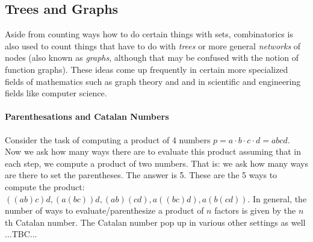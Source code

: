 
\subsection{Trees and Graphs}
Aside from counting ways how to do certain things with sets, combinatorics is also used to count things that have to do with \emph{trees} or more general \emph{networks} of nodes (also known as \emph{graphs}, although that may be confused with the notion of function graphs). These ideas come up frequently in certain more specialized fields of mathematics such as graph theory and and in scientific and engineering fields like computer science.



\paragraph{Parenthesations and Catalan Numbers}
Consider the task of computing a product of 4 numbers $p = a \cdot b \cdot c  \cdot d = abcd$. Now we ask how many ways there are to evaluate this product assuming that in each step, we compute a product of two numbers. That is: we ask how many ways are there to set the parentheses. The answer is 5. These are the 5 ways to compute the product: $((ab)c)d, (a(bc))d, (ab)(cd), a((bc)d), a(b(cd))$. In general, the number of ways to evaluate/parenthesize a product of $n$ factors is given by the $n$th Catalan number. The Catalan number pop up in various other settings as well  ...TBC...








